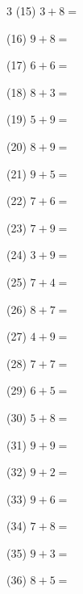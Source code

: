 \documentclass[a4paper, 11pt]{ltjsarticle}
\begin{document}
\begin{multicols*}{3}
\noindent (15) \quad $3 + 8 =$
\vspace*{\fill}

\noindent (16) \quad $9 + 8 =$
\vspace*{\fill}

\noindent (17) \quad $6 + 6 =$
\vspace*{\fill}

\noindent (18) \quad $8 + 3 =$
\vspace*{\fill}

\noindent (19) \quad $5 + 9 =$
\vspace*{\fill}

\noindent (20) \quad $8 + 9 =$
\vspace*{\fill}

\noindent (21) \quad $9 + 5 =$
\vspace*{\fill}

\noindent (22) \quad $7 + 6 =$
\vspace*{\fill}

\noindent (23) \quad $7 + 9 =$
\vspace*{\fill}

\noindent (24) \quad $3 + 9 =$
\vspace*{\fill}
\columnbreak

\noindent (25) \quad $7 + 4 =$
\vspace*{\fill}

\noindent (26) \quad $8 + 7 =$
\vspace*{\fill}

\noindent (27) \quad $4 + 9 =$
\vspace*{\fill}

\noindent (28) \quad $7 + 7 =$
\vspace*{\fill}

\noindent (29) \quad $6 + 5 =$
\vspace*{\fill}

\noindent (30) \quad $5 + 8 =$
\vspace*{\fill}

\noindent (31) \quad $9 + 9 =$
\vspace*{\fill}

\noindent (32) \quad $9 + 2 =$
\vspace*{\fill}

\noindent (33) \quad $9 + 6 =$
\vspace*{\fill}

\noindent (34) \quad $7 + 8 =$
\vspace*{\fill}

\noindent (35) \quad $9 + 3 =$
\vspace*{\fill}

\noindent (36) \quad $8 + 5 =$
\vspace*{\fill}

\end{multicols*}
\end{document}
